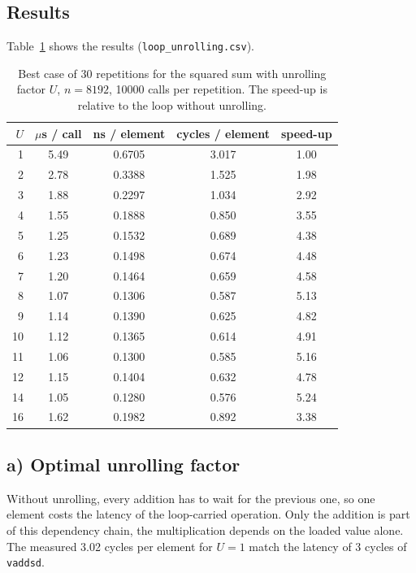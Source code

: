 \documentclass[a4paper,11pt]{article}
\begin{document}
\subsection{Results}

Table~\ref{tab:results} shows the results (\texttt{loop\_unrolling.csv}).

\begin{table}[ht]
    \centering
    \caption{Best case of 30 repetitions for the squared sum with unrolling
    factor $U$, $n = 8192$, 10000 calls per repetition. The speed-up is
    relative to the loop without unrolling.}
    \label{tab:results}
    \begin{tabular}{rcccc}
        \hline
        $U$ & $\mu$s / call & ns / element & cycles / element & speed-up \\
        \hline
        1  & 5.49 & 0.6705 & 3.017 & 1.00 \\
        2  & 2.78 & 0.3388 & 1.525 & 1.98 \\
        3  & 1.88 & 0.2297 & 1.034 & 2.92 \\
        4  & 1.55 & 0.1888 & 0.850 & 3.55 \\
        5  & 1.25 & 0.1532 & 0.689 & 4.38 \\
        6  & 1.23 & 0.1498 & 0.674 & 4.48 \\
        7  & 1.20 & 0.1464 & 0.659 & 4.58 \\
        8  & 1.07 & 0.1306 & 0.587 & 5.13 \\
        9  & 1.14 & 0.1390 & 0.625 & 4.82 \\
        10 & 1.12 & 0.1365 & 0.614 & 4.91 \\
        11 & 1.06 & 0.1300 & 0.585 & 5.16 \\
        12 & 1.15 & 0.1404 & 0.632 & 4.78 \\
        14 & 1.05 & 0.1280 & 0.576 & 5.24 \\
        16 & 1.62 & 0.1982 & 0.892 & 3.38 \\
        \hline
    \end{tabular}
\end{table}

\subsection{a) Optimal unrolling factor}

Without unrolling, every addition has to wait for the previous one, so one
element costs the latency of the loop-carried operation. Only the addition is
part of this dependency chain, the multiplication depends on the loaded value
alone. The measured 3.02 cycles per element for $U = 1$ match the latency of
3 cycles of \texttt{vaddsd}.
\end{document}
